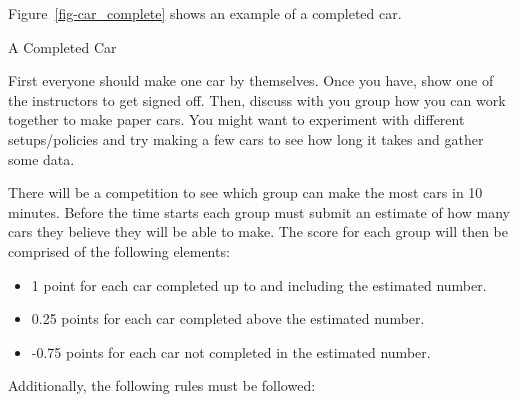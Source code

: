 \documentclass[
  10pt,
  a4paperpaper,
  DIV=11,
  numbers=noendperiod,
  oneside]{scrreprt}
\providecommand{\tightlist}{%
  \setlength{\itemsep}{0pt}\setlength{\parskip}{0pt}}\usepackage{longtable,booktabs,array}
\begin{document}
Figure~\ref{fig-car_complete} shows an example of a completed car.

\begin{marginfigure}


\caption{\label{fig-car_complete}A Completed Car}

\end{marginfigure}%

First everyone should make one car by themselves. Once you have, show
one of the instructors to get signed off. Then, discuss with you group
how you can work together to make paper cars. You might want to
experiment with different setups/policies and try making a few cars to
see how long it takes and gather some data.

There will be a competition to see which group can make the most cars in
10 minutes. Before the time starts each group must submit an estimate of
how many cars they believe they will be able to make. The score for each
group will then be comprised of the following elements:

\begin{itemize}
\tightlist
\item
  1 point for each car completed up to and including the estimated
  number.
\item
  0.25 points for each car completed above the estimated number.
\item
  -0.75 points for each car not completed in the estimated number.
\end{itemize}

Additionally, the following rules must be followed:
\end{document}
